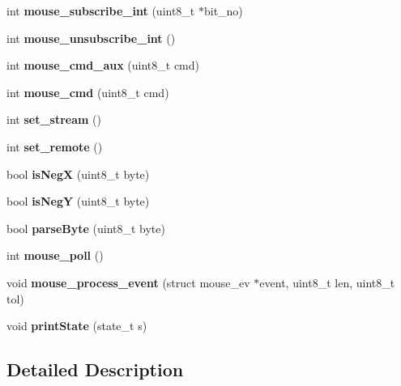 \begin{DoxyCompactItemize}
\item 
\mbox{\label{group__Mouse_ga9da18257ff113b686bb826d154bfaa87}} 
int {\bfseries mouse\+\_\+subscribe\+\_\+int} (uint8\+\_\+t $\ast$bit\+\_\+no)
\item 
\mbox{\label{group__Mouse_ga685ad2706aca36d9869a30a19b9f446a}} 
int {\bfseries mouse\+\_\+unsubscribe\+\_\+int} ()
\item 
\mbox{\label{group__Mouse_ga70825ff49a0e9cc81aa0148ac197588c}} 
int {\bfseries mouse\+\_\+cmd\+\_\+aux} (uint8\+\_\+t cmd)
\item 
\mbox{\label{group__Mouse_ga8cd252646eb8e65184320de4e0c0c84a}} 
int {\bfseries mouse\+\_\+cmd} (uint8\+\_\+t cmd)
\item 
\mbox{\label{group__Mouse_ga1e389a1205568df4f4df692cb91c3e58}} 
int {\bfseries set\+\_\+stream} ()
\item 
\mbox{\label{group__Mouse_gaf9e89446799ba064ad541fc09ae63622}} 
int {\bfseries set\+\_\+remote} ()
\item 
\mbox{\label{group__Mouse_ga8ff41a47522aad3b4d294c57d5f73b0d}} 
bool {\bfseries is\+NegX} (uint8\+\_\+t byte)
\item 
\mbox{\label{group__Mouse_ga23af978019637cd5f395da21930c4637}} 
bool {\bfseries is\+NegY} (uint8\+\_\+t byte)
\item 
\mbox{\label{group__Mouse_ga578c3aef6f04a2ba416c85d243a14160}} 
bool {\bfseries parse\+Byte} (uint8\+\_\+t byte)
\item 
\mbox{\label{group__Mouse_ga89b8537deb2d062702383d4da3e921a0}} 
int {\bfseries mouse\+\_\+poll} ()
\item 
\mbox{\label{group__Mouse_ga23d5d554be9464100375d26a7a7c896d}} 
void {\bfseries mouse\+\_\+process\+\_\+event} (struct mouse\+\_\+ev $\ast$event, uint8\+\_\+t len, uint8\+\_\+t tol)
\item 
\mbox{\label{group__Mouse_gaa5238447ce500063773d23acda749558}} 
void {\bfseries print\+State} (state\+\_\+t s)
\end{DoxyCompactItemize}


\subsection{Detailed Description}
